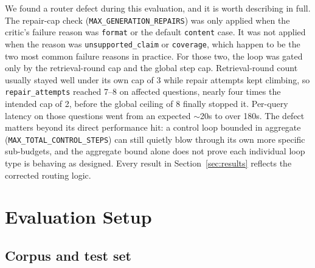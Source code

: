 \documentclass[conference]{IEEEtran}
\begin{document}
We found a router defect during this evaluation, and it is worth describing in full.
The repair-cap check (\texttt{MAX\_GENERATION\_REPAIRS}) was only applied when the
critic's failure reason was \texttt{format} or the default \texttt{content} case. It
was not applied when the reason was \texttt{unsupported\_claim} or \texttt{coverage},
which happen to be the two most common failure reasons in practice. For those two, the
loop was gated only by the retrieval-round cap and the global step cap. Retrieval-round
count usually stayed well under its own cap of 3 while repair attempts kept climbing,
so \texttt{repair\_attempts} reached 7--8 on affected questions, nearly four times the
intended cap of 2, before the global ceiling of 8 finally stopped it. Per-query latency
on those questions went from an expected $\sim$20s to over 180s. The defect matters
beyond its direct performance hit: a control loop bounded in aggregate
(\texttt{MAX\_TOTAL\_CONTROL\_STEPS}) can still quietly blow through its own
more specific sub-budgets, and the aggregate bound alone does not prove each individual
loop type is behaving as designed. Every result in Section~\ref{sec:results} reflects
the corrected routing logic.

\section{Evaluation Setup}
\label{sec:setup}

\subsection{Corpus and test set}
\label{sec:corpus}
\end{document}
